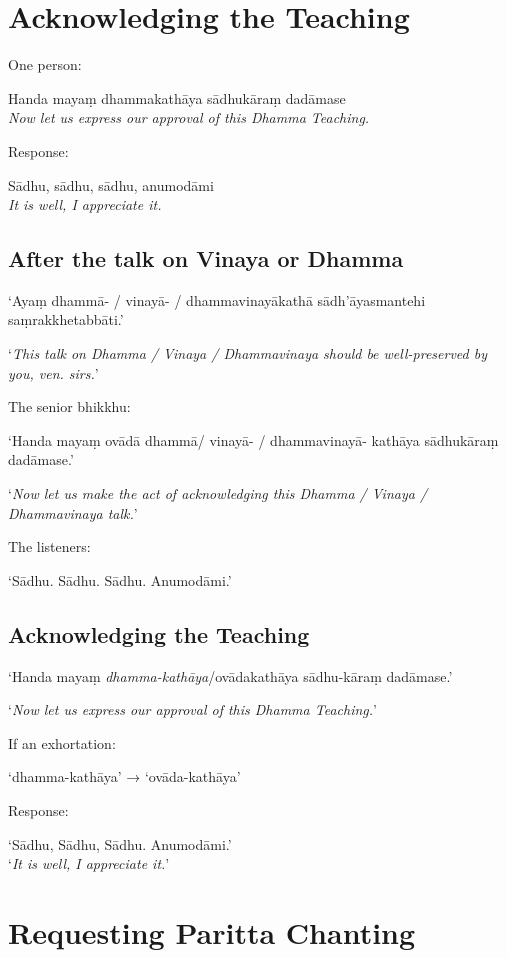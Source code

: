 \section{Acknowledging the Teaching}

One person:

Handa mayaṃ dhammakathāya sādhukāraṃ dadāmase\\
\emph{Now let us express our approval of this Dhamma Teaching.}

Response:

Sādhu, sādhu, sādhu, anumodāmi\\
\emph{It is well, I appreciate it.}

\subsection{After the talk on Vinaya or Dhamma}

‘Ayaṃ dhammā- / vinayā- / dhammavinayākathā sādh'āyasmantehi saṃrakkhetabbāti.’

‘\emph{This talk on Dhamma / Vinaya / Dhammavinaya should be well-preserved by you, ven. sirs.}’

The senior bhikkhu:

‘Handa mayaṃ ovādā dhammā/ vinayā- / dhammavinayā- kathāya sādhukāraṃ dadāmase.’

‘\emph{Now let us make the act of acknowledging this Dhamma / Vinaya / Dhammavinaya talk.}’

The listeners:

‘Sādhu. Sādhu. Sādhu. Anumodāmi.’

\subsection{Acknowledging the Teaching}

‘Handa mayaṃ \emph{dhamma-kathāya}/ovādakathāya sādhu-kāraṃ dadāmase.’

‘\emph{Now let us express our approval of this Dhamma Teaching.}’

If an exhortation:

‘dhamma-kathāya’ → ‘ovāda-kathāya’

Response:

‘Sādhu, Sādhu, Sādhu. Anumodāmi.’\\
‘\emph{It is well, I appreciate it.}’

\clearpage

\section{Requesting Paritta Chanting}

